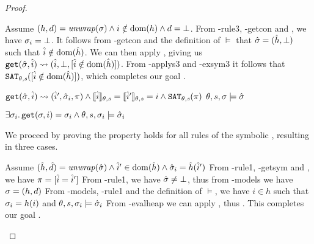 \begin{proof}
\begin{hypvlist}
 Assume $(h,d)={\operatorname{\mathit{unwrap}}}(\sigma) \land i\notin\operatorname{dom}(h) \land d=\bot$.
 From \hyp{rule3}, \hyp{getcon} and , we have $\sigma_i=\bot$.
 It follows from \hyp{getcon} and the definition of $\models$ that $\hat{\sigma}=(\hat{h}, \bot)$ such that $\hat{i}\notin \operatorname{dom}(\hat{h})$.
 We can then apply , giving us $\texttt{get}(\hat{\sigma},\hat{i})\rightsquigarrow(\hat{i},\bot,[\hat{i}\notin \operatorname{dom}(\hat{h})])$.%
 From \hyp{applys3} and \hyp{exsym3} it follows that $\texttt{SAT}_{\mathit{\theta,s}}([\hat{i}\notin \operatorname{dom}(\hat{h})])$, which completes our goal .
\end{hypvlist}


\pfassume \begin{hypvlist}
 $\texttt{get}(\hat{\sigma},\hat{i})\rightsquigarrow(\hat{i}', \hat{\sigma}_i, \pi) \land \llbracket\hat{i}\rrbracket_{\theta,s}=\llbracket\hat{i}'\rrbracket_{\theta,s}=i \land \texttt{SAT}_{\mathit{\theta,s}}(\pi)$
 $\theta,s,\sigma\models\hat{\sigma}$
\end{hypvlist}
\pfprove \begin{goalvlist}
 $\exists \sigma_i \ldotp \texttt{get}(\sigma, i)=\sigma_i \land \theta,s,\sigma_i \models \hat{\sigma}_i$
\end{goalvlist}

We proceed by proving the property holds for all rules of the symbolic , resulting in three cases.


\begin{hypvlist}
 Assume $(\hat{h},\hat{d})={\operatorname{\mathit{unwrap}}}(\hat{\sigma}) \land \hat{i}'\in\operatorname{dom}(\hat{h}) \land \hat{\sigma}_i=\hat{h}(\hat{i}')$
 From \hyp{rule1}, \hyp{getsym} and , we have $\pi=[\hat{i}=\hat{i}']$
 From \hyp{rule1}, we have $\hat{\sigma}\neq\bot$, thus from \hyp{models} we have $\sigma=(h, d)$
 From \hyp{models}, \hyp{rule1} and the definition of $\models$, we have $i\in h$ such that $\sigma_i=h(i)$ and ${\theta,s,\sigma_i\models\hat{\sigma}_i}$
 From \hyp{evalheap} we can apply , thus . This completes our goal .
\end{hypvlist}



\end{proof}
